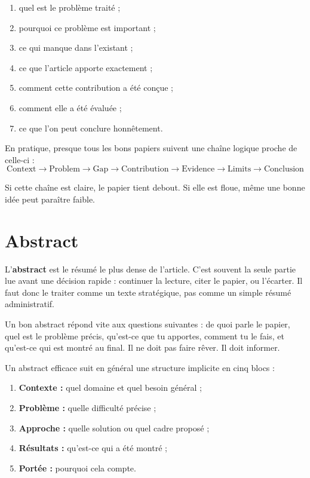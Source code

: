 \documentclass[11pt,a4paper]{article}
\theoremstyle{definition}
\begin{document}
\begin{enumerate}[label=\arabic*.]
    \item quel est le problème traité ;
    \item pourquoi ce problème est important ;
    \item ce qui manque dans l'existant ;
    \item ce que l'article apporte exactement ;
    \item comment cette contribution a été conçue ;
    \item comment elle a été évaluée ;
    \item ce que l'on peut conclure honnêtement.
\end{enumerate}

En pratique, presque tous les bons papiers suivent une chaîne logique proche de celle-ci :
\[
\text{Context} \rightarrow \text{Problem} \rightarrow \text{Gap} \rightarrow \text{Contribution} \rightarrow \text{Evidence} \rightarrow \text{Limits} \rightarrow \text{Conclusion}
\]

Si cette chaîne est claire, le papier tient debout. Si elle est floue, même une bonne idée peut paraître faible.



\section{Abstract}


L'\textbf{abstract} est le résumé le plus dense de l'article. C'est souvent la seule partie lue avant une décision rapide : continuer la lecture, citer le papier, ou l'écarter. Il faut donc le traiter comme un texte stratégique, pas comme un simple résumé administratif.

Un bon abstract répond vite aux questions suivantes : de quoi parle le papier, quel est le problème précis, qu'est-ce que tu apportes, comment tu le fais, et qu'est-ce qui est montré au final. Il ne doit pas faire rêver. Il doit informer.


Un abstract efficace suit en général une structure implicite en cinq blocs :
\begin{enumerate}[label=\arabic*.]
    \item \textbf{Contexte :} quel domaine et quel besoin général ;
    \item \textbf{Problème :} quelle difficulté précise ;
    \item \textbf{Approche :} quelle solution ou quel cadre proposé ;
    \item \textbf{Résultats :} qu'est-ce qui a été montré ;
    \item \textbf{Portée :} pourquoi cela compte.
\end{enumerate}
\end{document}
